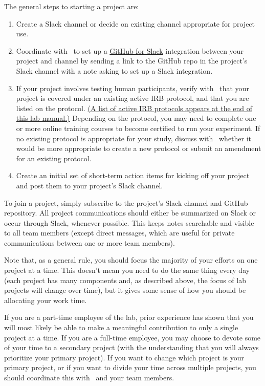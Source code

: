\documentclass{tufte-book} %
\begin{document}
The general steps to starting a project are:
\begin{enumerate}

  \item Create a Slack channel or decide on existing channel
    appropriate for project use.
  \item Coordinate with \director~to set up a \href{https://get.slack.help/hc/en-us/articles/232289568-GitHub-for-Slack}{GitHub
      for Slack} integration between your project and channel by sending a link to the GitHub repo in the project's Slack channel with a note asking to set up a Slack integration.
   \item If your project involves testing human participants, verify
     with \director~that your project is covered under an existing
     active IRB protocol, and that you are listed on the protocol. \hyperref[ch:irb]{(A list of
active IRB protocols appears at the end of this lab manual.)}
Depending on the protocol, you may need to complete one or more online
training courses to become certified to run your experiment.  If no
existing protocol is appropriate for your study, discuss with
\director~whether it would be more appropriate to create a new protocol or
submit an amendment for an existing protocol.
    \item Create an initial set of short-term action items for kicking
      off your project and post them to your project's Slack channel.
\end{enumerate}


{}

\noindent To join a project, simply subscribe to the project's Slack channel and
GitHub repository.  All project communications should either be
summarized on Slack or occur through Slack, whenever possible.  This
keeps notes searchable and visible to all team members (except direct
messages, which are useful for private communications between one or
more team members).

Note that, as a general rule, you should focus the majority of your
efforts on one project at a time.  This doesn't mean you need to do
the same thing every day (each project has many components and, as
described above, the focus of lab projects will change over time), but
it gives some sense of how you should be allocating your work time.

If you are a part-time employee of the lab, prior experience has shown
that you will most likely be able to make a meaningful contribution to
only a single project at a time.  If you are a full-time employee, you
may choose to devote some of your time to a secondary project (with
the understanding that you will always prioritize your primary
project).  If you want to change which project is your primary
project, or if you want to divide your time across multiple projects,
you should coordinate this with \director~and your team
members.
\end{document}
